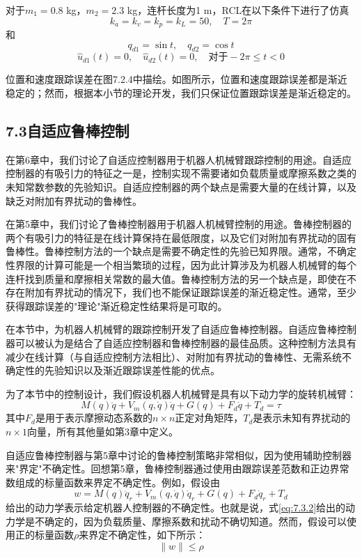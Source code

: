\documentclass[UTF8]{ctexart}
\begin{document}
对于$m_1=0.8$ kg，$m_2=2.3$ kg，连杆长度为1 m，RCL在以下条件下进行了仿真
\begin{equation*}
k_a = k_v = k_p = k_L = 50, \quad T = 2\pi
\end{equation*}
和
\begin{equation*}
q_{d1} = \sin t, \quad q_{d2} = \cos t
\end{equation*}
\begin{equation*}
\hat{u}_{d1}(t) = 0, \quad \hat{u}_{d2}(t) = 0, \quad \text{对于} -2\pi \leq t < 0
\end{equation*}

位置和速度跟踪误差在图7.2.4中描绘。如图所示，位置和速度跟踪误差都是渐近稳定的；然而，根据本小节的理论开发，我们只保证位置跟踪误差是渐近稳定的。

\subsection*{7.3\quad 自适应鲁棒控制}

在第6章中，我们讨论了自适应控制器用于机器人机械臂跟踪控制的用途。自适应控制器的有吸引力的特征之一是，控制实现不需要诸如负载质量或摩擦系数之类的未知常数参数的先验知识。自适应控制器的两个缺点是需要大量的在线计算，以及缺乏对附加有界扰动的鲁棒性。

在第5章中，我们讨论了鲁棒控制器用于机器人机械臂控制的用途。鲁棒控制器的两个有吸引力的特征是在线计算保持在最低限度，以及它们对附加有界扰动的固有鲁棒性。鲁棒控制方法的一个缺点是需要不确定性的先验已知界限。通常，不确定性界限的计算可能是一个相当繁琐的过程，因为此计算涉及为机器人机械臂的每个连杆找到质量和摩擦相关常数的最大值。鲁棒控制方法的另一个缺点是，即使在不存在附加有界扰动的情况下，我们也不能保证跟踪误差的渐近稳定性。通常，至少获得跟踪误差的"理论"渐近稳定性结果将是可取的。

在本节中，为机器人机械臂的跟踪控制开发了自适应鲁棒控制器。自适应鲁棒控制器可以被认为是结合了自适应控制器和鲁棒控制器的最佳品质。这种控制方法具有减少在线计算（与自适应控制方法相比）、对附加有界扰动的鲁棒性、无需系统不确定性的先验知识以及渐近跟踪误差性能的优点。

为了本节中的控制设计，我们假设机器人机械臂是具有以下动力学的旋转机械臂：
\begin{equation}\label{eq:7.3.1}
M(q)\ddot{q} + V_m(q,\dot{q})\dot{q} + G(q) + F_d\dot{q} + T_d = \tau
\end{equation}
其中$F_d$是用于表示摩擦动态系数的$n \times n$正定对角矩阵，$T_d$是表示未知有界扰动的$n \times 1$向量，所有其他量如第3章中定义。

自适应鲁棒控制器与第5章中讨论的鲁棒控制策略非常相似，因为使用辅助控制器来"界定"不确定性。回想第5章，鲁棒控制器通过使用由跟踪误差范数和正边界常数组成的标量函数来界定不确定性。例如，假设由
\begin{equation}\label{eq:7.3.2}
w = M(q)\ddot{q}_r + V_m(q,\dot{q})\dot{q}_r + G(q) + F_d\dot{q}_r + T_d
\end{equation}
给出的动力学表示给定机器人控制器的不确定性。也就是说，式\eqref{eq:7.3.2}给出的动力学是不确定的，因为负载质量、摩擦系数和扰动不确切知道。然而，假设可以使用正的标量函数$\rho$来界定不确定性，如下所示：
\begin{equation}\label{eq:7.3.3}
\|w\| \leq \rho
\end{equation}
\end{document}
